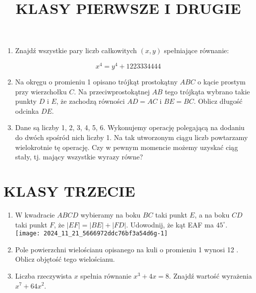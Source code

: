 \documentclass[10pt]{article}
\title{KLASY PIERWSZE I DRUGIE }
\author{}
\date{}
\begin{document}
\maketitle
\begin{enumerate}
  \item Znajdź wszystkie pary liczb całkowitych \((x, y)\) spełniające równanie:
\end{enumerate}

\[
x^{4}=y^{4}+1223334444
\]

\begin{enumerate}
  \setcounter{enumi}{1}
  \item Na okręgu o promieniu 1 opisano trójkąt prostokątny \(A B C\) o kącie prostym przy wierzchołku \(C\). Na przeciwprostokątnej \(A B\) tego trójkąta wybrano takie punkty \(D\) i \(E\), że zachodzą równości \(A D=A C\) i \(B E=B C\). Oblicz długość odcinka \(D E\).
  \item Dane są liczby 1, 2, 3, 4, 5, 6. Wykonujemy operację polegającą na dodaniu do dwóch spośród nich liczby 1. Na tak utworzonym ciągu liczb powtarzamy wielokrotnie tę operację. Czy w pewnym momencie możemy uzyskać ciąg stały, tj. mający wszystkie wyrazy równe?
\end{enumerate}

\section*{KLASY TRZECIE}
\begin{enumerate}
  \item W kwadracie \(A B C D\) wybieramy na boku \(B C\) taki punkt \(E\), a na boku \(C D\) taki punkt \(F\), że \(|E F|=|B E|+|F D|\). Udowodnij, że kąt EAF ma \(45^{\circ}\).\\
\texttt{[image: 2024\_11\_21\_5666972ddc76bf3a54d6g-1]}
  \item Pole powierzchni wielościanu opisanego na kuli o promieniu 1 wynosi 12 . Oblicz objętość tego wielościanu.
  \item Liczba rzeczywista \(x\) spełnia równanie \(x^{3}+4 x=8\). Znajdź wartość wyrażenia \(x^{7}+64 x^{2}\).
\end{enumerate}
\end{document}
